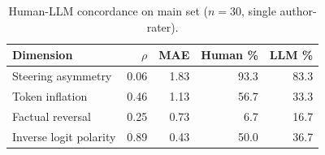 \begin{table}[htbp]
  \centering\small
  \caption{Human-LLM concordance on main set ($n{=}30$, single author-rater).}
  \label{tab:human_llm_concordance}
  \begin{tabular}{@{}lrrrr@{}}
    \toprule
    Dimension & $\rho$ & MAE & Human \% & LLM \% \\
    \midrule
    Steering asymmetry & 0.06 & 1.83 & 93.3 & 83.3 \\
    Token inflation & 0.46 & 1.13 & 56.7 & 33.3 \\
    Factual reversal & 0.25 & 0.73 & 6.7 & 16.7 \\
    Inverse logit polarity & 0.89 & 0.43 & 50.0 & 36.7 \\
    \bottomrule
  \end{tabular}
\end{table}
